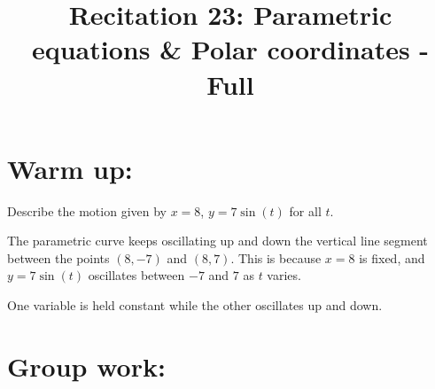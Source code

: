 \documentclass[]{ximera}
\title{Recitation 23: Parametric equations \& Polar coordinates - Full}
\begin{document}
\begin{abstract}		\end{abstract}
\maketitle




\section{Warm up:}
Describe the motion given by $x=8$, $y=7 \sin (t)$ for all $t$.
	\begin{freeResponse}
	The parametric curve keeps oscillating up and down the vertical line segment between the points $(8,-7)$ and $(8,7)$.
	This is because $x=8$ is fixed, and $y = 7 \sin(t)$ oscillates between $-7$ and $7$ as $t$ varies.
	\end{freeResponse}
	
\begin{instructorNotes}
One variable is held constant while the other oscillates up and down.
\end{instructorNotes}







\section{Group work:}
\end{document}
